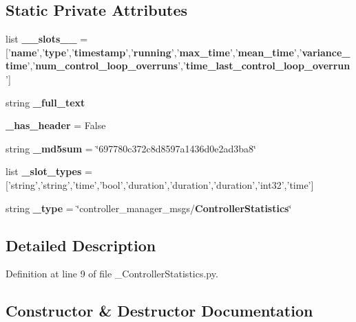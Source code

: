 \subsection*{\-Static \-Private \-Attributes}
\begin{DoxyCompactItemize}
\item 
list {\bf \-\_\-\-\_\-slots\-\_\-\-\_\-} = ['{\bf name}','{\bf type}','{\bf timestamp}','{\bf running}','{\bf max\-\_\-time}','{\bf mean\-\_\-time}','{\bf variance\-\_\-time}','{\bf num\-\_\-control\-\_\-loop\-\_\-overruns}','{\bf time\-\_\-last\-\_\-control\-\_\-loop\-\_\-overrun}']
\item 
string {\bf \-\_\-full\-\_\-text}
\item 
{\bf \-\_\-has\-\_\-header} = \-False
\item 
string {\bf \-\_\-md5sum} = \char`\"{}697780c372c8d8597a1436d0e2ad3ba8\char`\"{}
\item 
list {\bf \-\_\-slot\-\_\-types} = ['string','string','time','bool','duration','duration','duration','int32','time']
\item 
string {\bf \-\_\-type} = \char`\"{}controller\-\_\-manager\-\_\-msgs/{\bf \-Controller\-Statistics}\char`\"{}
\end{DoxyCompactItemize}


\subsection{\-Detailed \-Description}


\-Definition at line 9 of file \-\_\-\-Controller\-Statistics.\-py.



\subsection{\-Constructor \& \-Destructor \-Documentation}
